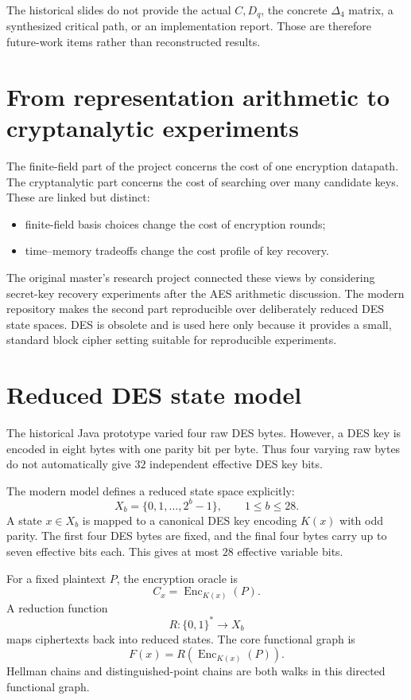 \documentclass[11pt]{article}
\newcommand{\Enc}{\operatorname{Enc}}
\begin{document}
The historical slides do not provide the actual $C,D_q$, the concrete
$\Delta_4$ matrix, a synthesized critical path, or an implementation report.
Those are therefore future-work items rather than reconstructed results.


\section{From representation arithmetic to cryptanalytic experiments}

The finite-field part of the project concerns the cost of one encryption
datapath.  The cryptanalytic part concerns the cost of searching over many
candidate keys.  These are linked but distinct:

\begin{itemize}
  \item finite-field basis choices change the cost of encryption rounds;
  \item time--memory tradeoffs change the cost profile of key recovery.
\end{itemize}

The original master's research project connected these views by considering secret-key
recovery experiments after the AES arithmetic discussion.  The modern
repository makes the second part reproducible over deliberately reduced DES
state spaces.  DES is obsolete and is used here only because it provides a
small, standard block cipher setting suitable for reproducible experiments.

\section{Reduced DES state model}

The historical Java prototype varied four raw DES bytes.  However, a DES key
is encoded in eight bytes with one parity bit per byte.  Thus four varying raw
bytes do not automatically give $32$ independent effective DES key bits.

The modern model defines a reduced state space explicitly:
\[
  X_b = \{0,1,\ldots,2^b-1\},
  \qquad 1\le b\le 28.
\]
A state $x\in X_b$ is mapped to a canonical DES key encoding $K(x)$ with odd
parity.  The first four DES bytes are fixed, and the final four bytes carry
up to seven effective bits each.  This gives at most $28$ effective variable
bits.

For a fixed plaintext $P$, the encryption oracle is
\[
  C_x = \Enc_{K(x)}(P).
\]
A reduction function
\[
  R:\{0,1\}^\ast\to X_b
\]
maps ciphertexts back into reduced states.  The core functional graph is
\[
  F(x)=R(\Enc_{K(x)}(P)).
\]
Hellman chains and distinguished-point chains are both walks in this directed
functional graph.
\end{document}
